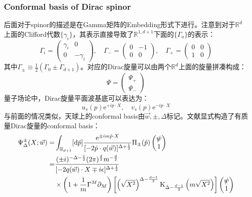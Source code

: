 \subsubsection{Conformal basis of Dirac spinor}
后面对于spinor的描述是在Gamma矩阵的Embedding形式下进行。注意到对于$\mathbb{R}^d$上面的Clifford代数$\{\gamma_i\}$，其表示直接导致了$\mathbb{R}^{1,d+1}$下面的$\{\Gamma_a\}$的表示：
\begin{equation}
	\Gamma_i=\begin{pmatrix}\gamma_i&0\\0&-\gamma_i\end{pmatrix},\quad\Gamma_-=\begin{pmatrix}0&-1\\0&0\end{pmatrix},\quad\Gamma_+=\begin{pmatrix}0&0\\1&0\end{pmatrix}
\end{equation}
其中$\Gamma_\pm\equiv\frac{1}{2}\left(\Gamma_0\pm\Gamma_{d+1}\right)$。对应的Dirac旋量可以由两个$\mathbb{R}^d$上面的旋量拼凑构成：
\[\Psi=\begin{pmatrix}\Psi_+\\\Psi_-\end{pmatrix}\]
量子场论中，Dirac旋量平面波基底可以表达为：
\[u_s(p)\mathrm{e}^{+ip\cdot X},\quad v_s(p)\mathrm{e}^{-ip\cdot X}\]
与前面的情况类似，天球上的conformal basis由$\vec{w},\pm,\Delta$标记。文献\cite{Iacobacci:2020por}显式构造了有质量Dirac旋量的conformal basis：
\begin{equation}
	\begin{aligned}
		\Psi_\Delta^\pm(X;\vec{w})=&\int_{\mathbb{H}_{d+1}}[\mathrm{d}\hat{p}]\frac{\mathrm{e}^{\pm im\hat{p}\cdot X}}{[-2\hat{p}\cdot q(\vec{w})]^{\Delta+\frac{1}{2}}}\Pi_\pm(\hat{p})\begin{pmatrix}\slashed{w}\\1\end{pmatrix}	\\
		=&\frac{(\pm i)^{-\Delta-\frac12}(2\pi)^{\frac d2}m^{-\frac d2}}{[-2q(\vec{w})\cdot X\mp i\epsilon]^{\Delta+\frac12}} \\
		&\times\left(1+\frac1m\Gamma^M\partial_M\right)\left[\left(\sqrt{X^2}\right)^{\Delta-\frac{d-1}2}\mathrm{K}_{\Delta-\frac{d-1}2}\left(m\sqrt{X^2}\right)\right]\begin{pmatrix}\slashed{w}\\1\end{pmatrix}
	\end{aligned}
\end{equation}
